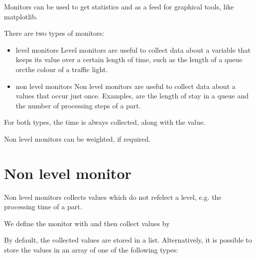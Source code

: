 \documentclass[letterpaper,10pt,english]{sphinxmanual}
\begin{document}
Monitors can be used to get statistics and as a feed for graphical tools, like matplotlib.

There are two types of monitors:
\begin{itemize}
\item {} 
level monitors
Level monitors are useful to collect data about a variable that keeps its value over a certain length
of time, such as the length of a queue orcthe colour of a traffic light.

\item {} 
non level monitors
Non level monitors are useful to collect data about a values that occur just once. Examples, are the length of stay in a queue and
the number of processing steps of a part.

\end{itemize}

For both types, the time is always collected, along with the value.

Non level monitors can be weighted, if required.


\section{Non level monitor}
\label{\detokenize{Monitor:non-level-monitor}}
Non level monitors collects values which do not refelect a level, e.g. the processing time of a part.

We define the monitor with  and then
collect values by 

By default, the collected values are stored in a list. Alternatively, it is possible to store
the values in an array of one of the following types:
\end{document}
